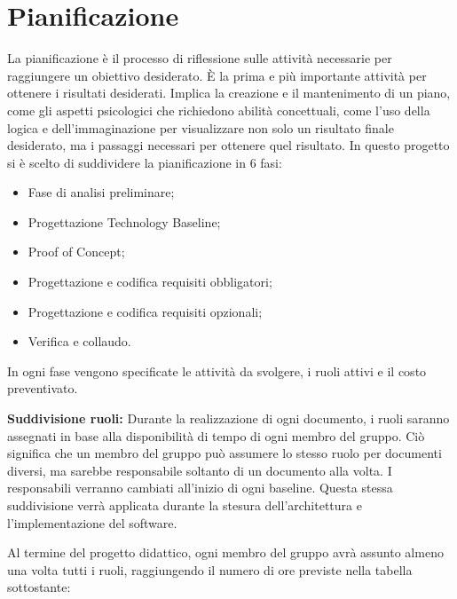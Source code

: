 \chapter{Pianificazione}
La pianificazione è il processo di riflessione sulle attività necessarie per raggiungere un obiettivo desiderato. È la prima e più importante attività per ottenere i risultati desiderati. Implica la creazione e il mantenimento di un piano, come gli aspetti psicologici che richiedono abilità concettuali, come l'uso della logica e dell'immaginazione per visualizzare non solo un risultato finale desiderato, ma i passaggi necessari per ottenere quel risultato. In questo progetto si è scelto di suddividere la pianificazione in 6 fasi: 
\begin{itemize}
    \item Fase di analisi preliminare;
    \item Progettazione Technology Baseline;
    \item Proof of Concept;
    \item Progettazione e codifica requisiti obbligatori;
    \item Progettazione e codifica requisiti opzionali;
    \item Verifica e collaudo.
\end{itemize}
In ogni fase vengono specificate le attività da svolgere, i ruoli attivi e il costo preventivato.

\textbf{Suddivisione ruoli:}
Durante la realizzazione di ogni documento, i ruoli saranno assegnati in base alla disponibilità di tempo di ogni membro del gruppo. Ciò significa che un membro del gruppo può assumere lo stesso ruolo per documenti diversi, ma sarebbe responsabile soltanto di un documento alla volta. I responsabili verranno cambiati all'inizio di ogni baseline. Questa stessa suddivisione verrà applicata durante la stesura dell'architettura e l'implementazione del software.

Al termine del progetto didattico, ogni membro del gruppo avrà assunto almeno una volta tutti i ruoli, raggiungendo il numero di ore previste nella tabella sottostante:

